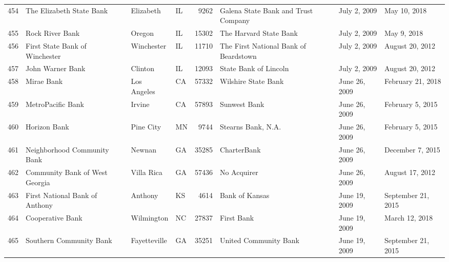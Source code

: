\begin{tabular}{llllrlll}
454 &                           The Elizabeth State Bank &           Elizabeth &  IL &   9262 &                Galena State Bank and Trust Company &        July 2, 2009 &        May 10, 2018 \\
455 &                                    Rock River Bank &              Oregon &  IL &  15302 &                             The Harvard State Bank &        July 2, 2009 &         May 9, 2018 \\
456 &                     First State Bank of Winchester &          Winchester &  IL &  11710 &              The First National Bank of Beardstown &        July 2, 2009 &     August 20, 2012 \\
457 &                                   John Warner Bank &             Clinton &  IL &  12093 &                              State Bank of Lincoln &        July 2, 2009 &     August 20, 2012 \\
458 &                                         Mirae Bank &         Los Angeles &  CA &  57332 &                                Wilshire State Bank &       June 26, 2009 &   February 21, 2018 \\
459 &                                  MetroPacific Bank &              Irvine &  CA &  57893 &                                       Sunwest Bank &       June 26, 2009 &    February 5, 2015 \\
460 &                                       Horizon Bank &           Pine City &  MN &   9744 &                                 Stearns Bank, N.A. &       June 26, 2009 &    February 5, 2015 \\
461 &                        Neighborhood Community Bank &              Newnan &  GA &  35285 &                                        CharterBank &       June 26, 2009 &    December 7, 2015 \\
462 &                     Community Bank of West Georgia &          Villa Rica &  GA &  57436 &                                        No Acquirer &       June 26, 2009 &     August 17, 2012 \\
463 &                     First National Bank of Anthony &             Anthony &  KS &   4614 &                                     Bank of Kansas &       June 19, 2009 &  September 21, 2015 \\
464 &                                   Cooperative Bank &          Wilmington &  NC &  27837 &                                         First Bank &       June 19, 2009 &      March 12, 2018 \\
465 &                            Southern Community Bank &        Fayetteville &  GA &  35251 &                              United Community Bank &       June 19, 2009 &  September 21, 2015 \\

\end{tabular}
